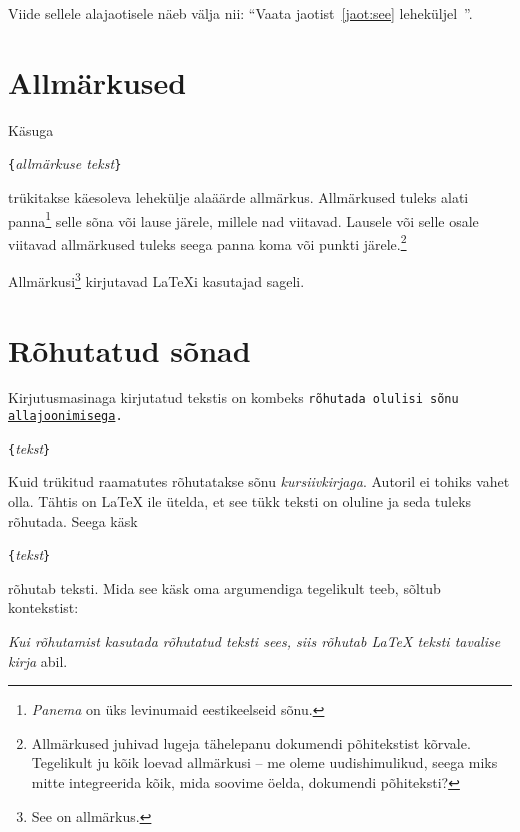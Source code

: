 \begin{example}
Viide sellele alajaotisele
\label{jaot:see} näeb välja nii:
"`Vaata jaotist~\ref{jaot:see}
leheküljel~\pageref{jaot:see}"'.
\end{example}

\section{Allmärkused}

Käsuga
\begin{lscommand}
\verb|{|\emph{allmärkuse tekst}\verb|}|
\end{lscommand}
\noindent trükitakse käesoleva lehekülje alaäärde allmärkus. Allmärkused
tuleks alati panna\footnote{\emph{Panema} on üks levinumaid
eestikeelseid sõnu.} selle sõna või lause järele, millele nad viitavad.
Lausele või selle osale viitavad allmärkused tuleks seega panna koma või
punkti järele.\footnote{Allmärkused juhivad lugeja tähelepanu dokumendi
põhitekstist kõrvale. Tegelikult ju kõik loevad allmärkusi -- me oleme
uudishimulikud, seega miks mitte integreerida kõik, mida soovime öelda,
dokumendi põhiteksti?\footnotemark}

\begin{example}
Allmärkusi\footnote{See on
  allmärkus.} kirjutavad
\LaTeX i kasutajad sageli.
\end{example}

\section{Rõhutatud sõnad}

Kirjutusmasinaga kirjutatud tekstis on kombeks \texttt{rõhutada olulisi
sõnu \underline{allajoonimisega}.}%
\begin{lscommand}
\verb|{|\emph{tekst}\verb|}|
\end{lscommand}
\noindent Kuid trükitud raamatutes rõhutatakse sõnu
\emph{kursiivkirjaga}. Autoril ei tohiks vahet olla. Tähtis on \LaTeX
ile ütelda, et see tükk teksti on oluline ja seda tuleks rõhutada. Seega
käsk
\begin{lscommand}
\verb|{|\emph{tekst}\verb|}|
\end{lscommand}
\noindent rõhutab teksti. Mida see käsk oma argumendiga tegelikult teeb,
sõltub kontekstist:

\begin{example}
\emph{Kui rõhutamist kasutada
rõhutatud teksti sees, siis
rõhutab \LaTeX{} teksti
\emph{tavalise} kirja} abil.
\end{example}

